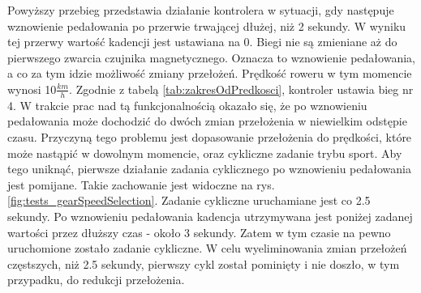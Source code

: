 Powyższy przebieg przedstawia działanie kontrolera w sytuacji, gdy następuje wznowienie pedałowania po przerwie trwającej dłużej, niż 2 sekundy. W wyniku tej przerwy wartość kadencji jest ustawiana na 0. Biegi nie są zmieniane aż do pierwszego zwarcia czujnika magnetycznego. Oznacza to wznowienie pedałowania, a co za tym idzie możliwość zmiany przełożeń. Prędkość roweru w tym momencie wynosi 10$\frac{km}{h}$. Zgodnie z tabelą \ref{tab:zakresOdPredkosci}, kontroler ustawia bieg nr 4. W trakcie prac nad tą funkcjonalnością okazało się, że po wznowieniu pedałowania może dochodzić do dwóch zmian przełożenia w niewielkim odstępie czasu. Przyczyną tego problemu jest dopasowanie przełożenia do prędkości, które może nastąpić w dowolnym momencie, oraz cykliczne zadanie trybu sport. Aby tego uniknąć, pierwsze działanie zadania cyklicznego po wznowieniu pedałowania jest pomijane. Takie zachowanie jest widoczne na rys. \ref{fig:tests_gearSpeedSelection}. Zadanie cykliczne uruchamiane jest co 2.5 sekundy. Po wznowieniu pedałowania kadencja utrzymywana jest poniżej zadanej wartości przez dłuższy czas - około 3 sekundy. Zatem w tym czasie na pewno uruchomione zostało zadanie cykliczne. W celu wyeliminowania zmian przełożeń częstszych, niż 2.5 sekundy, pierwszy cykl został pominięty i nie doszło, w tym przypadku, do redukcji przełożenia.







